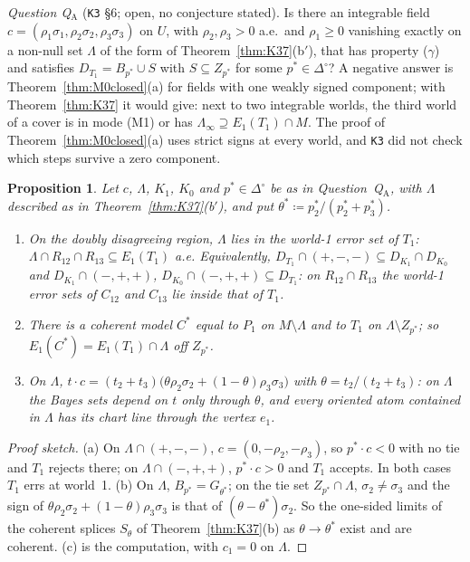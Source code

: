 \documentclass[11pt]{article}
\newtheorem{proposition}[theorem]{Proposition}
\theoremstyle{definition}
\theoremstyle{remark}
\newcommand{\Di}{\Delta^{\circ}}
\newcommand{\src}[1]{\texttt{#1}}
\begin{document}
\emph{Question Q$_{\mathrm A}$} (\src{K3} \S6; open, no conjecture stated). Is there an integrable field $c=(\rho_1\sigma_1,\rho_2\sigma_2,\rho_3\sigma_3)$ on $U$, with $\rho_2,\rho_3>0$ a.e.\ and $\rho_1\ge0$ vanishing exactly on a non-null set $\Lambda$ of the form of Theorem~\ref{thm:K37}(b$'$), that has property ($\gamma$) and satisfies $D_{T_1}=B_{p^*}\cup S$ with $S\subseteq Z_{p^*}$ for some $p^*\in\Di$? A negative answer is Theorem~\ref{thm:M0closed}(a) for fields with one weakly signed component; with Theorem~\ref{thm:K37} it would give: next to two integrable worlds, the third world of a cover is in mode (M1) or has $\Lambda_\infty\supseteq E_1(T_1)\cap M$. The proof of Theorem~\ref{thm:M0closed}(a) uses strict signs at every world, and \src{K3} did not check which steps survive a zero component.

\begin{proposition}\label{prop:KQA}
Let $c$, $\Lambda$, $K_1$, $K_0$ and $p^*\in\Di$ be as in Question~Q$_{\mathrm A}$, with $\Lambda$ described as in Theorem~\ref{thm:K37}(b$'$), and put $\theta^*\coloneqq p^*_2/(p^*_2+p^*_3)$.
\begin{enumerate}[leftmargin=*,label=(\alph*)]
\item On the doubly disagreeing region, $\Lambda$ lies in the world-1 error set of $T_1$: $\Lambda\cap R_{12}\cap R_{13}\subseteq E_1(T_1)$ a.e. Equivalently, $D_{T_1}\cap(+,-,-)\subseteq D_{K_1}\cap D_{K_0}$ and $D_{K_1}\cap(-,+,+)$, $D_{K_0}\cap(-,+,+)\subseteq D_{T_1}$: on $R_{12}\cap R_{13}$ the world-1 error sets of $C_{12}$ and $C_{13}$ lie inside that of $T_1$.
\item There is a coherent model $C^*$ equal to $P_1$ on $M\setminus\Lambda$ and to $T_1$ on $\Lambda\setminus Z_{p^*}$; so $E_1(C^*)=E_1(T_1)\cap\Lambda$ off $Z_{p^*}$.
\item On $\Lambda$, $t\cdot c=(t_2+t_3)\bigl(\theta\rho_2\sigma_2+(1-\theta)\rho_3\sigma_3\bigr)$ with $\theta=t_2/(t_2+t_3)$: on $\Lambda$ the Bayes sets depend on $t$ only through $\theta$, and every oriented atom contained in $\Lambda$ has its chart line through the vertex $e_1$.
\end{enumerate}
\end{proposition}
\begin{proof}[Proof sketch]
(a) On $\Lambda\cap(+,-,-)$, $c=(0,-\rho_2,-\rho_3)$, so $p^*\cdot c<0$ with no tie and $T_1$ rejects there; on $\Lambda\cap(-,+,+)$, $p^*\cdot c>0$ and $T_1$ accepts. In both cases $T_1$ errs at world~1. (b) On $\Lambda$, $B_{p^*}=G_{\theta^*}$; on the tie set $Z_{p^*}\cap\Lambda$, $\sigma_2\ne\sigma_3$ and the sign of $\theta\rho_2\sigma_2+(1-\theta)\rho_3\sigma_3$ is that of $(\theta-\theta^*)\sigma_2$. So the one-sided limits of the coherent splices $S_\theta$ of Theorem~\ref{thm:K37}(b) as $\theta\to\theta^*$ exist and are coherent. (c) is the computation, with $c_1=0$ on $\Lambda$.
\end{proof}
\end{document}
